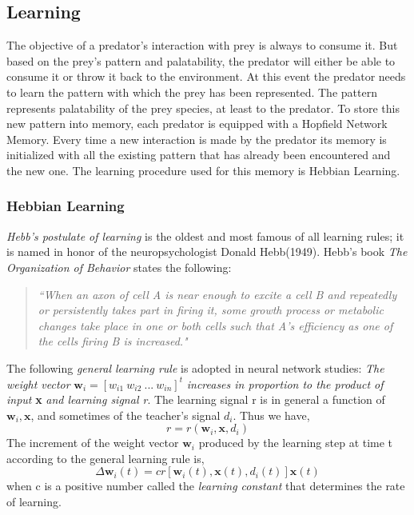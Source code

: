 \subsection{Learning}
The objective of a predator's interaction with prey is always to consume it. But based on the prey's pattern and palatability, the predator will either be able to consume it or throw it back to the environment. At this event the predator needs to learn the pattern with which the prey has been represented. The pattern represents palatability of the prey species, at least to the predator. To store this new pattern into memory, each predator is equipped with a Hopfield Network Memory. Every time a new interaction is made by the predator its memory is initialized with all the existing pattern that has already been encountered and the new one. The learning procedure used for this memory is Hebbian Learning. 

\subsubsection{Hebbian Learning}
\textit{Hebb's postulate of learning} is the oldest and most famous of all learning rules; it is named in honor of the neuropsychologist Donald Hebb(1949). Hebb's book \textit{The Organization of Behavior} \cite{hebb1949} states the following:

\begin{quote}
\textsl{``When an axon of cell A is near enough to excite a cell B and repeatedly or persistently takes part in firing it, some growth process or metabolic changes take place in one or both cells such that A's efficiency as one of the cells firing B is increased."}
\end{quote}

The following \textit{general learning rule} is adopted in neural network studies: \textit{The weight vector} \( \textbf{w}_i = [w_{i1} \> w_{i2} \> ... \> w_{in}]^t \) \textit{increases in proportion to the product of input} \textbf{x} \textit{and learning signal r}. The learning signal r is in general a function of \(\textbf{w}_i,\textbf{x}\), and sometimes of the teacher's signal \(d_i\). Thus we have, 
\begin{equation}
	r = r(\textbf{w}_i,\textbf{x},d_i)
\end{equation}
The increment of the weight vector \(\textbf{w}_i\) produced by the learning step at time t according to the general learning rule is,
\begin{equation}
	\Delta\textbf{w}_i(t)=cr[\textbf{w}_i(t),\textbf{x}(t),d_i(t)]\textbf{x}(t)
\end{equation}
when c is a positive number called the \textit{learning constant} that determines the rate of learning.

